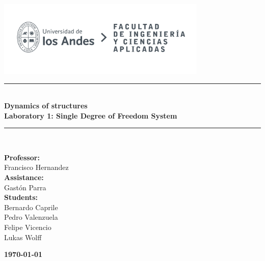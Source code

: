 \documentclass{article}  %
\begin{document}
\begin{titlepage}%
\newcommand{\HRule}{\rule{\linewidth}{0.5mm}} 
\center 
\includegraphics[width=10cm]{LOGO_UNIVERSIDAD.jpg}\\ %
\vspace{3cm}
\HRule \\[0.4cm]
{ \huge \bfseries Dynamics of structures}\\[0.4cm] %
{ \huge \bfseries Laboratory 1: Single Degree of Freedom System}\\[0.4cm] %
\HRule \\[1.5cm]
 \vspace{5cm}
\begin{flushright}
  { \textbf{Professor:}\\
  Francisco Hernandez\\
  \textbf{Assistance:}\\
  Gastón Parra\\
  \textbf{Students:} \\
  Bernardo Caprile\\
  Pedro Valenzuela\\
  Felipe Vicencio\\
  Lukas Wolff\\
}
\end{flushright}
\vspace{1cm}
{\large \textbf{\today}}\\[2cm] %
\end{titlepage}
\end{document}

